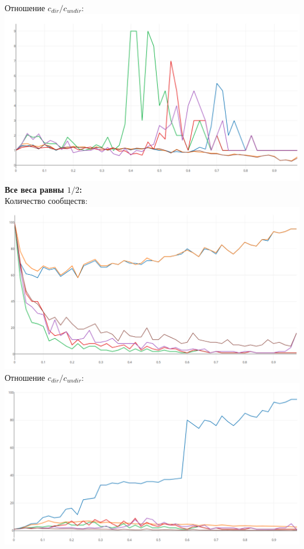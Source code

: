 Отношение $c_{dir}/c_{undir}$:\\
\includegraphics[scale=0.32]{pics/jaccard_d.png}
\newpage
{\bfseries Все веса равны $1/2$:} \\
Количество сообществ:\\
\includegraphics[scale=0.32]{pics/static_count.png}\\
Отношение $c_{dir}/c_{undir}$:\\
\includegraphics[scale=0.32]{pics/static_d.png}\\